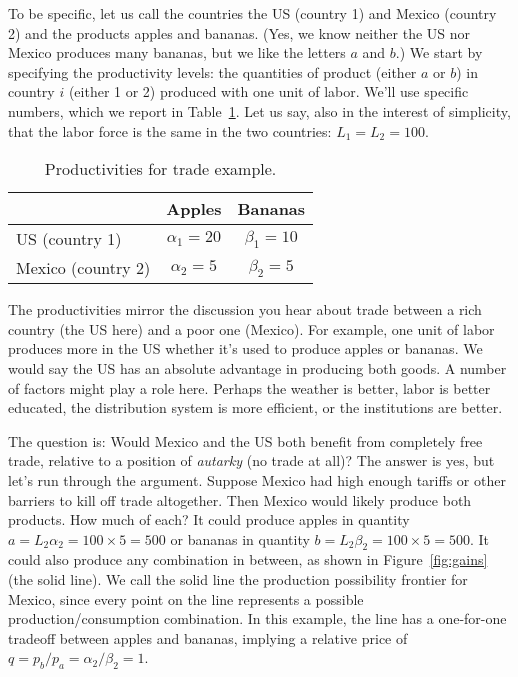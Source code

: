 To be specific, let us call the countries the US (country 1) and
Mexico (country 2) and the products apples and bananas.  (Yes, we
know neither the US nor Mexico produces many bananas, but we like
the letters $a$ and $b$.)  We start by specifying the productivity
levels: the quantities of product (either $a$ or $b$) in country
$i$ (either 1 or 2) produced with one unit of labor.
We'll use specific numbers, which we report in Table~\ref{tab:prod}.
Let us say, also in the interest of simplicity,
that the labor force is the same in the two countries: $L_{1}=L_{2}=100$.

\begin{table}[h]
\centering
\caption{Productivities for trade example.}
\begin{tabular}{lcc}
\toprule
                    &        Apples       &      Bananas    \\%

\midrule
US (country 1)      &   $\alpha_{1}=20$   & $\beta_{1}=10$  \\%
Mexico (country 2)  &   $\alpha_{2}=5$    & $\beta_{2}=5$   \\%
\bottomrule
\end{tabular}
\label{tab:prod}
\end{table}


The productivities mirror the discussion you hear about trade
between a rich country (the US here) and a poor one (Mexico).
For example, one unit of labor produces more in the US
whether it's used to produce apples or bananas.
We would say the US has an {absolute advantage} in producing both goods.
A number of factors might play a role here. Perhaps the weather is
better, labor is better educated, the distribution system is
more efficient, or the institutions are better.


The question is: Would Mexico and the US both benefit from
completely free trade, relative to a position of \textit{autarky}
(no trade at all)? The answer is yes, but let's run through
the argument. Suppose Mexico had high enough tariffs or other
barriers to kill off trade altogether. Then Mexico would likely
produce both products. How much of each? It could produce apples
in quantity $a=L_{2}\alpha_{2} = 100\times 5 = 500$ or bananas in
quantity $b=L_{2}\beta_{2} = 100\times 5 = 500$. It could also
produce any combination in between, as shown in
Figure~\ref{fig:gains} (the solid line). We call the solid line
the production possibility frontier for Mexico, since every point on the line
represents a possible production/consumption combination. In this example,
the line has a one-for-one tradeoff between apples and bananas,
implying a relative price of $ q=p_{b}/p_{a} =
\alpha_{2}/\beta_{2} = 1$.

